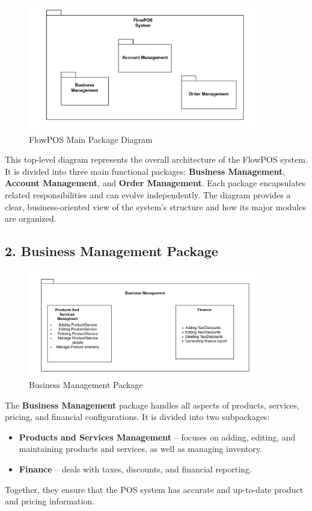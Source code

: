 \documentclass[11pt,a4paper,pdftex]{article}
\begin{document}
\begin{figure}[H]
    \centering
    \includegraphics[width=0.9\textwidth]{graphics/Package1.png}
    \caption{FlowPOS Main Package Diagram}
    \label{fig:package1}
\end{figure}

This top-level diagram represents the overall architecture of the FlowPOS system. 
It is divided into three main functional packages: \textbf{Business Management}, \textbf{Account Management}, and \textbf{Order Management}. 
Each package encapsulates related responsibilities and can evolve independently. 
The diagram provides a clear, business-oriented view of the system’s structure and how its major modules are organized.

\subsection{2. Business Management Package}

\begin{figure}[H]
    \centering
    \includegraphics[width=0.9\textwidth]{graphics/Package2.png}
    \caption{Business Management Package}
    \label{fig:package2}
\end{figure}

The \textbf{Business Management} package handles all aspects of products, services, pricing, and financial configurations. 
It is divided into two subpackages:
\begin{itemize}
    \item \textbf{Products and Services Management} – focuses on adding, editing, and maintaining products and services, as well as managing inventory.
    \item \textbf{Finance} – deals with taxes, discounts, and financial reporting.
\end{itemize}
Together, they ensure that the POS system has accurate and up-to-date product and pricing information.
\end{document}
